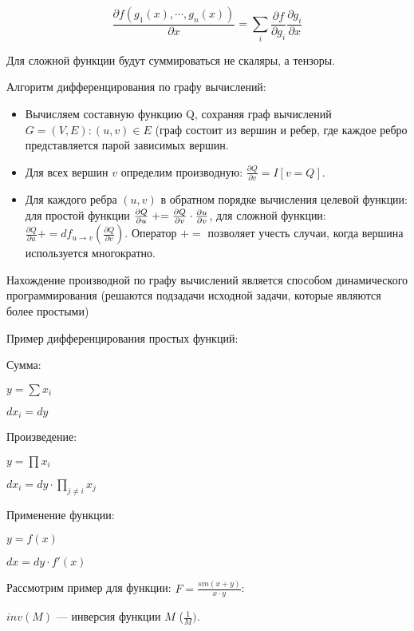 \[
    \frac{\partial f (g_1(x), \cdots, g_n(x))}{\partial x} = \sum_i
    \frac{\partial f}{\partial g_i} \frac{\partial g_i}{\partial x}
\]

Для сложной функции будут суммироваться не скаляры, а тензоры.


Алгоритм дифференцирования по графу вычислений:
\begin{itemize}
    \item Вычисляем составную функцию Q, сохраняя граф вычислений $G = (V, E):
        (u, v) \in E$ (граф состоит из вершин и ребер, где каждое ребро
        представляется парой зависимых вершин.

    \item Для всех вершин $v$ определим производную: $\frac{\partial
        Q}{\partial v} = I[v = Q]$.

    \item Для каждого ребра $(u, v)$ в обратном порядке вычисления целевой
        функции: для простой функции $\pade[Q]{u} \pluseq
        \frac{\partial Q}{\partial v} \cdot \frac{\partial u}{\partial v}$, для
        сложной функции: $\frac{\partial Q}{\partial u} += df_{u \to v}
        (\frac{\partial Q}{\partial v})$. Оператор $+=$ позволяет учесть
        случаи, когда вершина используется многократно.
\end{itemize}

Нахождение производной по графу вычислений является способом динамического
программирования (решаются подзадачи исходной задачи, которые являются более
простыми)

Пример дифференцирования простых функций:

Сумма:

$y = \sum x_i$

$dx_i = dy$


Произведение:

$y = \prod x_i$

$dx_i = dy \cdot \prod_{j \neq i} x_j$


Применение функции:

$y = f(x)$

$dx = dy \cdot f'(x)$


Рассмотрим пример для функции: $F = \frac{sin(x + y)}{x \cdot y}$:

$inv(M)$ --- инверсия функции $M$ ($\frac{1}{M})$.

